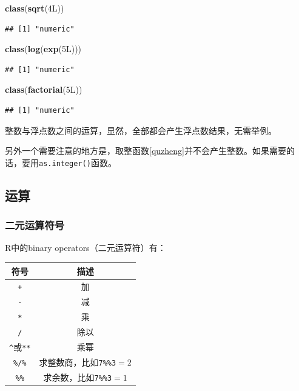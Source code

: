 \documentclass[]{book}
\newenvironment{Shaded}{\begin{snugshade}}{\end{snugshade}}
\newcommand{\KeywordTok}[1]{\textcolor[rgb]{0.13,0.29,0.53}{\textbf{#1}}}
\newcommand{\NormalTok}[1]{#1}
\begin{document}
\begin{Shaded}
\begin{Highlighting}[]
\KeywordTok{class}\NormalTok{(}\KeywordTok{sqrt}\NormalTok{(4L))}
\end{Highlighting}
\end{Shaded}

\begin{verbatim}
## [1] "numeric"
\end{verbatim}

\begin{Shaded}
\begin{Highlighting}[]
\KeywordTok{class}\NormalTok{(}\KeywordTok{log}\NormalTok{(}\KeywordTok{exp}\NormalTok{(5L)))}
\end{Highlighting}
\end{Shaded}

\begin{verbatim}
## [1] "numeric"
\end{verbatim}

\begin{Shaded}
\begin{Highlighting}[]
\KeywordTok{class}\NormalTok{(}\KeywordTok{factorial}\NormalTok{(5L))}
\end{Highlighting}
\end{Shaded}

\begin{verbatim}
## [1] "numeric"
\end{verbatim}

整数与浮点数之间的运算，显然，全部都会产生浮点数结果，无需举例。

另外一个需要注意的地方是，取整函数\ref{quzheng}并不会产生整数。如果需要的话，要用\texttt{as.integer()}函数。

\hypertarget{arithmetic}{%
\subsection{运算}\label{arithmetic}}

\subsubsection{二元运算符号}

R中的binary operators（二元运算符）有：

\begin{longtable}[]{@{}cc@{}}
\toprule
符号 & 描述\tabularnewline
\midrule
\endhead
\texttt{+} & 加\tabularnewline
\texttt{-} & 减\tabularnewline
\texttt{*} & 乘\tabularnewline
\texttt{/} & 除以\tabularnewline
\texttt{\^{}}或\texttt{**} & 乘幂\tabularnewline
\texttt{\%/\%} & 求整数商，比如\texttt{7\%\%3}\(=2\)\tabularnewline
\texttt{\%\%} & 求余数，比如\texttt{7\%\%3}\(=1\)\tabularnewline
\bottomrule
\end{longtable}
\end{document}

